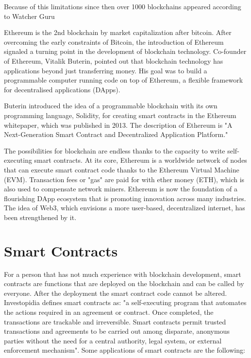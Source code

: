 Because of this limitations since then over 1000 blockchains appeared according to Watcher Guru \cite{watcherguru}
\par Ethereum is the 2nd blockchain by market capitalization after bitcoin. After overcoming the early constraints of Bitcoin, the introduction of Ethereum signaled a turning point in the development of blockchain technology. Co-founder of Ethereum, Vitalik Buterin, pointed out that blockchain technology has applications beyond just transferring money. His goal was to build a programmable computer running code on top of Ethereum, a flexible framework for decentralised applications (DApps).
\par Buterin introduced the idea of a programmable blockchain with its own programming language, Solidity, for creating smart contracts in the Ethereum whitepaper, which was published in 2013. The description of Ethereum is "A Next-Generation Smart Contract and Decentralized Application Platform." \cite{ethereumwhitepaper}
\par The possibilities for blockchain are endless thanks to the capacity to write self-executing smart contracts. At its core, Ethereum is a worldwide network of nodes that can execute smart contract code thanks to the Ethereum Virtual Machine (EVM). Transaction fees or "gas" are paid for with ether money (ETH), which is also used to compensate network miners. Ethereum is now the foundation of a flourishing DApp ecosystem that is promoting innovation across many industries. The idea of Web3, which envisions a more user-based, decentralized internet, has been strengthened by it.

\section{Smart Contracts}
\label{sec:ch2sec2}
For a person that has not much experience with blockchain development, smart contracts are functions that are deployed on the blockchain and can be called by everyone. After the deployment the smart contract code cannot be altered. Investopidia defines smart contracts as: "a self-executing program that automates the actions required in an agreement or contract. Once completed, the transactions are trackable and irreversible. Smart contracts permit trusted transactions and agreements to be carried out among disparate, anonymous parties without the need for a central authority, legal system, or external enforcement mechanism"\cite{smartcontracts}. Some applications of smart contracts are the following:

